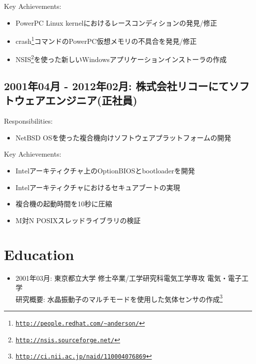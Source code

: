 \documentclass[letterpaper]{article}
\begin{document}
\noindent Key Achievements:

\begin{itemize}
  \item PowerPC Linux kernelにおけるレースコンディションの発見/修正
  \item crash\footnote{\href{http://people.redhat.com/{\textasciitilde}anderson/}{\tt http://people.redhat.com/{\textasciitilde}anderson/}}コマンドのPowerPC仮想メモリの不具合を発見/修正
  \item NSIS\footnote{\href{http://nsis.sourceforge.net/}{\tt http://nsis.sourceforge.net/}}を使った新しいWindowsアプリケーションインストーラの作成
\end{itemize}

\subsection*{2001年04月 - 2012年02月: 株式会社リコーにてソフトウェアエンジニア(正社員)}

\noindent Responsibilities:

\begin{itemize}
  \item NetBSD OSを使った複合機向けソフトウェアプラットフォームの開発
\end{itemize}

\noindent Key Achievements:

\begin{itemize}
  \item Intelアーキティクチャ上のOptionBIOSとbootloaderを開発
  \item Intelアーキティクチャにおけるセキュアブートの実現
  \item 複合機の起動時間を10秒に圧縮
  \item M対N POSIXスレッドライブラリの検証
\end{itemize}

\section*{Education}

\begin{itemize}
  \item 2001年03月: 東京都立大学 修士卒業/工学研究科電気工学専攻 電気・電子工学 \\
    研究概要: 水晶振動子のマルチモードを使用した気体センサの作成\footnote{\href{http://ci.nii.ac.jp/naid/110004076869}{\tt http://ci.nii.ac.jp/naid/110004076869}}
\end{itemize}
\end{document}
